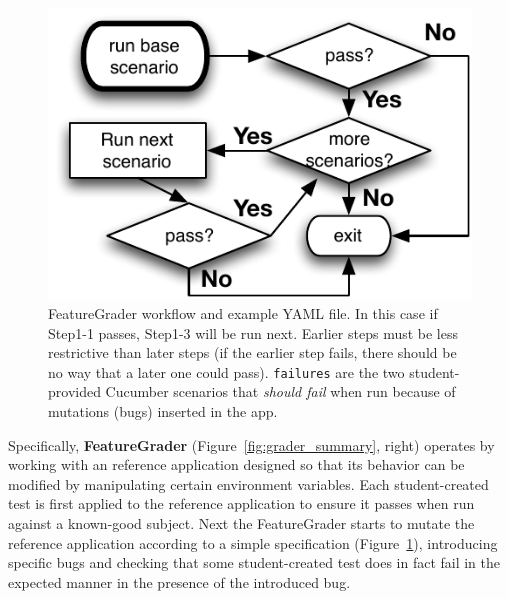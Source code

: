 \begin{figure}
  \begin{minipage}{0.45\textwidth}%
  \includegraphics[width=\textwidth]{figs/feature_grader.pdf}%
  \end{minipage}%
  \begin{minipage}{0.55\textwidth}%
  \end{minipage}
  \caption{\label{fig:featuregrader}%
FeatureGrader workflow and example YAML file.  In this case if Step1-1 passes,
Step1-3 will be run next.  Earlier steps must be less restrictive than
later steps (if the earlier step fails, there should be no way that a later one could pass).
\texttt{failures} are the two student-provided Cucumber scenarios that \emph{should fail} when
run because of mutations (bugs) inserted in the app.
}
\end{figure}


Specifically, \textbf{FeatureGrader}  (Figure~\ref{fig:grader_summary},
right)
operates by working with an
reference application designed so that its behavior can be modified by
manipulating certain environment variables.
Each student-created test   is first applied to the reference
application to ensure it passes when run against a known-good subject.
Next the FeatureGrader starts to mutate the reference application
according to a simple specification (Figure~\ref{fig:featuregrader}), 
introducing specific bugs and checking that some student-created test
does in fact fail in the expected manner in the presence of the
introduced bug.  

